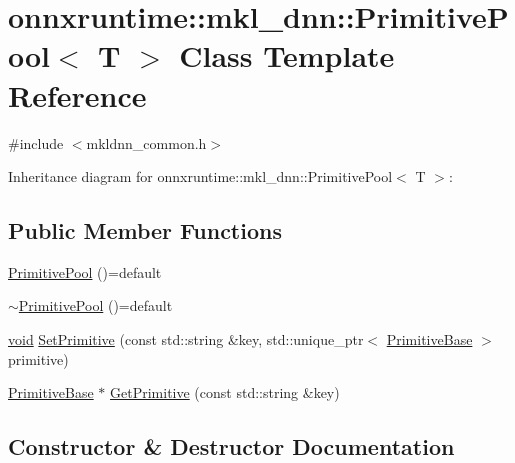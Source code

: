 \hypertarget{classonnxruntime_1_1mkl__dnn_1_1PrimitivePool}{}\section{onnxruntime\+:\+:mkl\+\_\+dnn\+:\+:Primitive\+Pool$<$ T $>$ Class Template Reference}
\label{classonnxruntime_1_1mkl__dnn_1_1PrimitivePool}


{\ttfamily \#include $<$mkldnn\+\_\+common.\+h$>$}



Inheritance diagram for onnxruntime\+:\+:mkl\+\_\+dnn\+:\+:Primitive\+Pool$<$ T $>$\+:
\subsection*{Public Member Functions}
\begin{DoxyCompactItemize}
\item 
\mbox{\hyperlink{classonnxruntime_1_1mkl__dnn_1_1PrimitivePool_a4f8cc4d5bbcedafd9c1e78b71a84144f}{Primitive\+Pool}} ()=default
\item 
\mbox{\hyperlink{classonnxruntime_1_1mkl__dnn_1_1PrimitivePool_aad529d222c13da30552c808c08cca556}{$\sim$\+Primitive\+Pool}} ()=default
\item 
\mbox{\hyperlink{mlasi_8h_a88f941d423cb2a819b70a1358982b1a6}{void}} \mbox{\hyperlink{classonnxruntime_1_1mkl__dnn_1_1PrimitivePool_a5eb4120ee1aba640eeba05b34603786e}{Set\+Primitive}} (const std\+::string \&key, std\+::unique\+\_\+ptr$<$ \mbox{\hyperlink{classonnxruntime_1_1mkl__dnn_1_1PrimitiveBase}{Primitive\+Base}} $>$ primitive)
\item 
\mbox{\hyperlink{classonnxruntime_1_1mkl__dnn_1_1PrimitiveBase}{Primitive\+Base}} $\ast$ \mbox{\hyperlink{classonnxruntime_1_1mkl__dnn_1_1PrimitivePool_a8f3ae795e873e575e50c376326ddf182}{Get\+Primitive}} (const std\+::string \&key)
\end{DoxyCompactItemize}


\subsection{Constructor \& Destructor Documentation}
\mbox{\label{classonnxruntime_1_1mkl__dnn_1_1PrimitivePool_a4f8cc4d5bbcedafd9c1e78b71a84144f}} 
